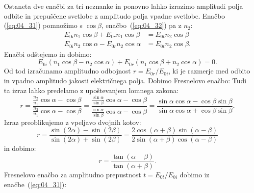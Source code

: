 Ostaneta dve enačbi za tri neznanke in ponovno lahko
izrazimo amplitudi polja odbite in prepuščene svetlobe z amplitudo polja vpadne svetlobe. 
Enačbo (\ref{eq:04_31}) pomnožimo s $\cos \beta$, enačbo~(\ref{eq:04_32}) pa z $n_2$:
\begin{align}
E_{0i} n_1 \cos \beta + E_{0r} n_1 \cos \beta  &= E_{0t} n_2 \cos \beta \label{eq:04_35} \\
E_{0i} n_2 \cos \alpha - E_{0r} n_2 \cos \alpha &= E_{0t} n_2 \cos \beta\label{eq:04_36}.
\end{align}
Enačbi odštejemo in dobimo:
\begin{equation}
E_{0i} \left(n_1 \cos \beta - n_2 \cos \alpha \right) + E_{0r} \left(n_1 \cos \beta + 
n_2 \cos \alpha \right) = 0.
\label{eq:04_37}
\end{equation}
Od tod izračunamo amplitudno odbojnost $r = E_{0r}/E_{0i}$, ki je 
razmerje med odbito in vpadno amplitudo jakosti električnega polja. Dobimo Fresnelovo enačbo:
Tudi ta izraz lahko predelamo z upoštevanjem lomnega zakona:
\begin{equation}
r = \frac{\frac{n_2}{n_1} \cos \alpha - \cos \beta}{\frac{n_2}{n_1} \cos \alpha - \cos \beta} = 
\frac{\frac{\sin \alpha}{\sin \beta} \cos \alpha - \cos \beta}
{\frac{\sin \alpha}{\sin \beta} \cos \alpha - \cos \beta} = 
\frac{\sin \alpha \cos \alpha -\cos \beta \sin \beta}
{\sin \alpha \cos \alpha + \cos \beta \sin \beta}.
\label{eq:04_38}
\end{equation}
Izraz preoblikujemo z vpeljavo dvojnih kotov:
\begin{equation}
r = \frac{\sin(2\alpha) - \sin(2\beta)}{\sin(2\alpha) + \sin(2\beta)} = \frac{2\cos(\alpha+\beta )\sin(\alpha-\beta )}
{2\sin(\alpha+\beta )\cos(\alpha-\beta )}
\label{eq:04_39}
\end{equation}
in dobimo:
\begin{equation}
r =\frac{\tan(\alpha-\beta )}{\tan(\alpha+\beta )}.
\label{eq:04_40}
\end{equation}
Fresnelovo enačbo za amplitudno prepustnost $t = E_{0t}/E_{0i}$ 
dobimo iz enačbe~(\ref{eq:04_31}):

